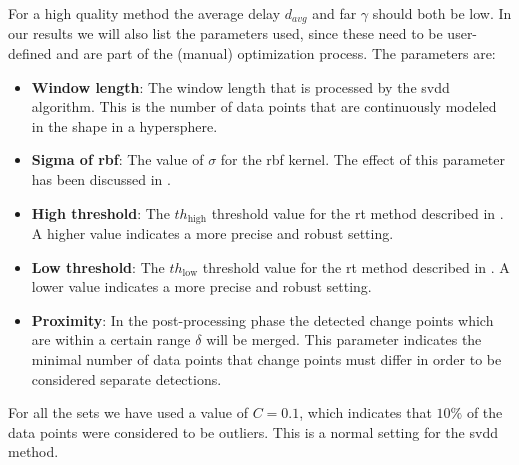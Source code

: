 For a high quality method the average delay $d_{avg}$ and \gls{far} $\gamma$ should both be low.
In our results we will also list the parameters used, since these need to be user-defined and are part of the (manual) optimization process.
The parameters are:
\begin{itemize}
  \item \textbf{Window length}: The window length that is processed by the \gls{svdd} algorithm.
  This is the number of data points that are continuously modeled in the shape in a hypersphere.
  \item \textbf{Sigma of \gls{rbf}}: The value of $\sigma$ for the \gls{rbf} kernel. The effect of this parameter has been discussed in .
  \item \textbf{High threshold}: The $th_\text{high}$ threshold value for the \gls{rt} method described in .
  A higher value indicates a more precise and robust setting.
  \item \textbf{Low threshold}: The $th_\text{low}$ threshold value for the \gls{rt} method described in .
  A lower value indicates a more precise and robust setting.
  \item \textbf{Proximity}: In the post-processing phase the detected change points which are within a certain range $\delta$ will be merged.
  This parameter indicates the minimal number of data points that change points must differ in order to be considered separate detections.
\end{itemize}
For all the sets we have used a value of $C = 0.1$, which indicates that $10\%$ of the data points were considered to be outliers.
This is a normal setting for the \gls{svdd} method.